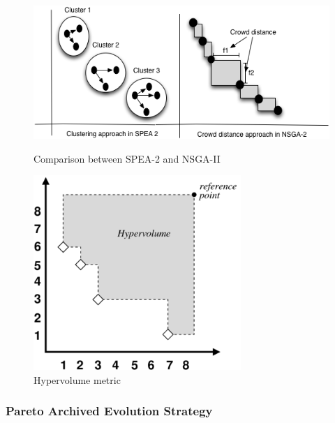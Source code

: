 \documentclass[espaco=umemeio,chapter=TITLE,twoside,openright]{abnt}
\begin{document}
\begin{figure}[h]
\begin{minipage}{.6\textwidth}
\centering
\includegraphics[width=1\textwidth]{./images/speansga.png}
\caption{Comparison between SPEA-2 and NSGA-II \cite{Deb2005}}
\label{fig:speansga}
\end{minipage}
\begin{minipage}{.4\textwidth}
\centering
\includegraphics[width=0.7\textwidth]{./images/hypervolume-annot.png}
\caption{Hypervolume metric \cite{Lacour2015}}
\label{fig:hypervolume}
\end{minipage}
\end{figure}


\subsubsection{Pareto Archived Evolution Strategy} 
\end{document}

